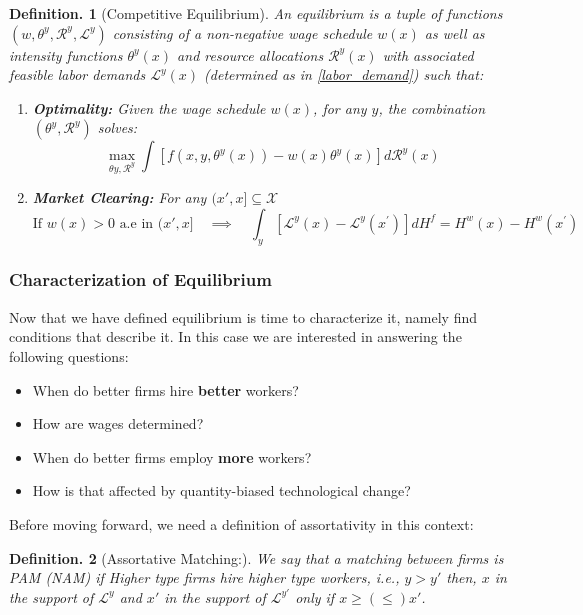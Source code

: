 \documentclass[12pt]{article}
\newtheorem{defin}{Definition.}
\theoremstyle{definition}
\begin{document}
\begin{defin}[Competitive Equilibrium]
An equilibrium is a tuple of functions $\left(w, \theta^{y}, \mathcal{R}^{y}, \mathcal{L}^{y}\right)$ consisting of a non-negative wage schedule $w(x)$ as well as intensity functions $\theta^{y}(x)$ and resource allocations $\mathcal{R}^{y}(x)$ with associated feasible labor demands $\mathcal{L}^{y}(x)$ (determined as in \eqref{labor_demand}) such that:
\begin{enumerate}
    \item \textbf{Optimality:} Given the wage schedule $w(x)$, for any $y$, the combination $\left(\theta^{y}, \mathcal{R}^{y}\right)$ solves:$$\max _{\theta y, \mathcal{R}^{y}} \int\left[f\left(x, y, \theta^{y}(x)\right)-w(x) \theta^{y}(x)\right] d \mathcal{R}^{y}(x)$$
    \item \textbf{Market Clearing:} For any $(x',x]\subseteq\mathcal{X}$
    $$\text{If } w(x)>0 \text{ a.e in } (x', x]  \quad \implies \quad   \int_{y}\left[\mathcal{L}^{y}(x)-\mathcal{L}^{y}\left(x^{\prime}\right)\right] d H^{f} = H^{w}(x)-H^{w}\left(x^{\prime}\right) $$
\end{enumerate}

\end{defin}

\subsubsection{Characterization of Equilibrium}
Now that we have defined equilibrium is time to characterize it, namely find conditions that describe it. In this case we are interested in answering the following questions:
\begin{itemize}
    \item  When do better firms hire \textbf{better} workers?
    \item  How are wages determined?
    \item  When do better firms employ \textbf{more} workers?
    \item  How is that affected by quantity-biased technological change?
\end{itemize}

 Before moving forward, we need a definition of assortativity in this context:

\begin{defin}[Assortative Matching:] 
We say that a matching between firms is PAM (NAM) if Higher type firms hire higher type workers, i.e., $y>y'$ then, $x$ in the support of $\mathcal{L}^y$ and $x'$ in the support of $\mathcal{L}^{y'}$ only if $x\geq (\leq) x'$.
\end{defin}
\end{document}
